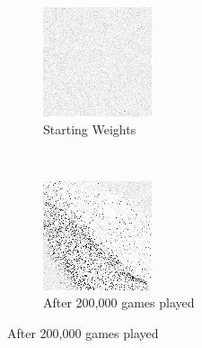 
\begin{figure}
\center

	\begin{subfigure}[b]{0.4\textwidth}
	\includegraphics[width=\linewidth]{images/findings/round1/flipbook_a.png}
	\caption{Starting Weights}
	\end{subfigure}
	~
	\begin{subfigure}[b]{0.4\textwidth}
	\includegraphics[width=\linewidth]{images/findings/round1/flipbook_b.png}
	\caption{After 200,000 games played}
	\end{subfigure}


\end{figure}
